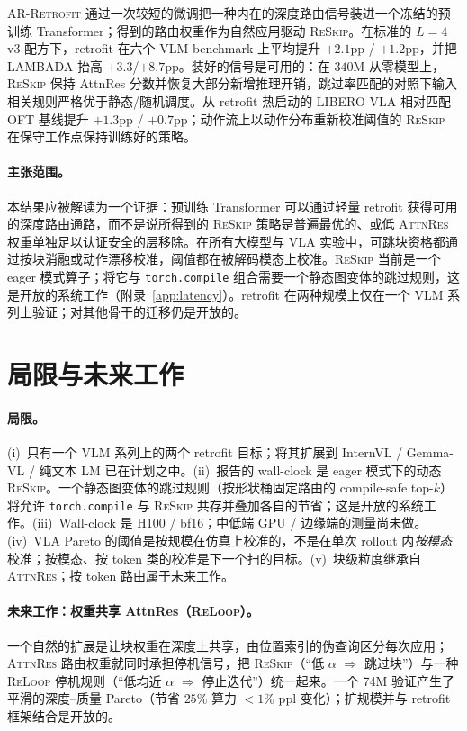 \documentclass{article}
\newcommand{\attnres}{\textsc{AttnRes}}
\newcommand{\reskip}{\textsc{ReSkip}}
\newcommand{\reloop}{\textsc{ReLoop}}
\newcommand{\retrofit}{\textsc{AR-Retrofit}}
\begin{document}
\retrofit{} 通过一次较短的微调把一种内在的深度路由信号装进一个冻结的预训练 Transformer；得到的路由权重作为自然应用驱动 \reskip{}。在标准的 $L{=}4$ v3 配方下，retrofit 在六个 VLM benchmark 上平均提升 $+2.1$pp / $+1.2$pp，并把 LAMBADA 抬高 $+3.3$/$+8.7$pp。装好的信号是可用的：在 $340$M 从零模型上，\reskip{} 保持 AttnRes 分数并恢复大部分新增推理开销，跳过率匹配的对照下输入相关规则严格优于静态/随机调度。从 retrofit 热启动的 LIBERO VLA 相对匹配 OFT 基线提升 $+1.3$pp / $+0.7$pp；动作流上以动作分布重新校准阈值的 \reskip{} 在保守工作点保持训练好的策略。

\paragraph{主张范围。} 本结果应被解读为一个证据：预训练 Transformer 可以通过轻量 retrofit 获得可用的深度路由通路，而不是说所得到的 \reskip{} 策略是普遍最优的、或低 \attnres{} 权重单独足以认证安全的层移除。在所有大模型与 VLA 实验中，可跳块资格都通过按块消融或动作漂移校准，阈值都在被解码模态上校准。\reskip{} 当前是一个 eager 模式算子；将它与 \texttt{torch.compile} 组合需要一个静态图变体的跳过规则，这是开放的系统工作（附录~\ref{app:latency}）。retrofit 在两种规模上仅在一个 VLM 系列上验证；对其他骨干的迁移仍是开放的。



\appendix
\section{局限与未来工作}
\label{app:limitations}

\paragraph{局限。}
(i)~只有一个 VLM 系列上的两个 retrofit 目标；将其扩展到 InternVL / Gemma-VL / 纯文本 LM 已在计划之中。(ii)~报告的 wall-clock 是 eager 模式下的动态 \reskip{}。一个静态图变体的跳过规则（按形状桶固定路由的 compile-safe top-$k$）将允许 \texttt{torch.compile} 与 \reskip{} 共存并叠加各自的节省；这是开放的系统工作。(iii)~Wall-clock 是 H100 / bf16；中低端 GPU / 边缘端的测量尚未做。(iv)~VLA Pareto 的阈值是按规模在仿真上校准的，不是在单次 rollout 内\emph{按模态}校准；按模态、按 token 类的校准是下一个扫的目标。(v)~块级粒度继承自 \attnres{}；按 token 路由属于未来工作。

\paragraph{未来工作：权重共享 AttnRes（\reloop{}）。}
一个自然的扩展是让块权重在深度上共享，由位置索引的伪查询区分每次应用；\attnres{} 路由权重就同时承担停机信号，把 \reskip{}（``低 $\alpha$ $\Rightarrow$ 跳过块''）与一种 \reloop{} 停机规则（``低均近 $\alpha$ $\Rightarrow$ 停止迭代''）统一起来。一个 74M 验证产生了平滑的深度--质量 Pareto（节省 $25\%$ 算力 $<1\%$ ppl 变化）；扩规模并与 retrofit 框架结合是开放的。
\end{document}

